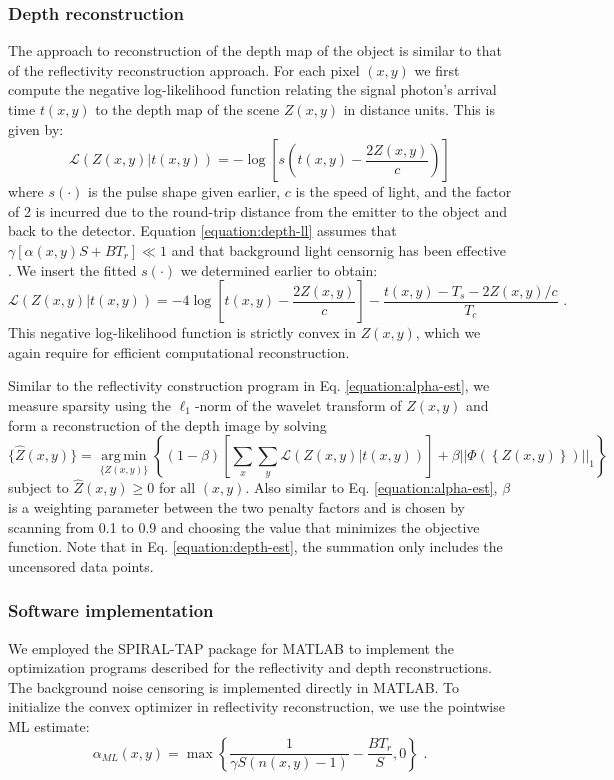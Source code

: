 \subsubsection{Depth reconstruction}
The approach to reconstruction of the depth map of the object is similar to that of the reflectivity reconstruction approach. For each pixel $(x,y)$ we first compute the negative log-likelihood function relating the signal photon's arrival time $t(x,y)$ to the depth map of the scene $Z(x,y)$ in distance units. This is given by:
\begin{equation}
\mathcal{L}(Z(x,y) | t(x,y)) = -\log\left[ s(t(x,y) - \frac{2Z(x,y)}{c}) \right]
\label{equation:depth-ll}
\end{equation}
where $s(\cdot)$ is the pulse shape given earlier, $c$ is the speed of light, and the factor of 2 is incurred due to the round-trip distance from the emitter to the object and back to the detector. Equation \ref{equation:depth-ll} assumes that $\gamma[\alpha(x,y)S + BT_r] \ll 1$ and that background light censornig has been effective \cite{kirmani-first}. We insert the fitted $s(\cdot)$ we determined earlier to obtain:
\begin{equation}
\mathcal{L}(Z(x,y) | t(x,y)) = -4\log\left[ t(x,y) - \frac{2Z(x,y)}{c} \right] - \frac{t(x,y) - T_s - 2Z(x,y)/c}{T_c}\,\,.
\end{equation}
This negative log-likelihood function is strictly convex in $Z(x,y)$, which we again require for efficient computational reconstruction.

Similar to the reflectivity construction program in Eq. \ref{equation:alpha-est}, we measure sparsity using the $\ell_1$-norm of the wavelet transform of $Z(x,y)$ and form a reconstruction of the depth image by solving
\begin{equation}
\{ \hat{Z}(x,y) \} = \underset{\{Z(x,y)\}}{\operatorname{arg\,min}} \left\{ (1 - \beta) \left[ \sum_x \sum_y \mathcal{L}( Z(x,y) | t(x,y) ) \right] + \beta || \Phi\left(\left\{ Z(x,y) \right\}\right) ||_1 \right\}
\label{equation:depth-est}
\end{equation}
subject to $\hat{Z}(x,y) \geq 0$ for all $(x,y)$. Also similar to Eq. \ref{equation:alpha-est}, $\beta$ is a weighting parameter between the two penalty factors and is chosen by scanning from 0.1 to 0.9 and choosing the value that minimizes the objective function. Note that in Eq. \ref{equation:depth-est}, the summation only includes the uncensored data points.

\subsubsection{Software implementation}
We employed the SPIRAL-TAP package for MATLAB \cite{harmany-spiral} to implement the optimization programs described for the reflectivity and depth reconstructions. The background noise censoring is implemented directly in MATLAB. To initialize the convex optimizer in reflectivity reconstruction, we use the pointwise ML estimate:
\begin{equation}
\alpha_{ML}(x,y) = \operatorname{max}\left\{ \frac{1}{\gamma S (n(x,y) - 1)} - \frac{BT_r}{S}, 0 \right\}\,\,.
\end{equation}

